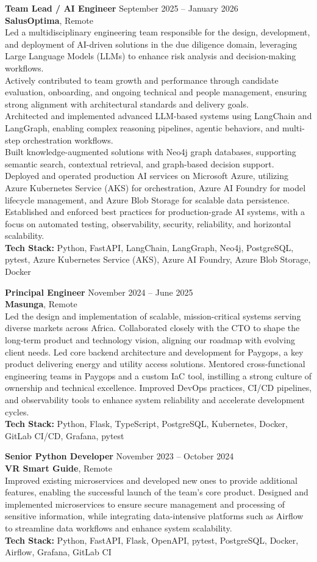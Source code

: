 \documentclass[margin, 10pt]{res} %
\newcommand{\jobheader}[4]{%
    \textbf{#1} \hfill #4\\
    \textbf{#2}, #3%
}
\newcommand{\jobentry}[6]{%
    \jobheader{#1}{#2}{#3}{#4}\\
    #5\\
    \textbf{Tech Stack:} #6
}
\begin{document}
\begin{resume}
    \jobentry{Team Lead / AI Engineer}{SalusOptima}{Remote}{September 2025 -- January 2026}{%
Led a multidisciplinary engineering team responsible for the design, development, and deployment of AI-driven solutions in the due diligence domain, leveraging Large Language Models (LLMs) to enhance risk analysis and decision-making workflows.\\
Actively contributed to team growth and performance through candidate evaluation, onboarding, and ongoing technical and people management, ensuring strong alignment with architectural standards and delivery goals.\\
Architected and implemented advanced LLM-based systems using LangChain and LangGraph, enabling complex reasoning pipelines, agentic behaviors, and multi-step orchestration workflows.\\
Built knowledge-augmented solutions with Neo4j graph databases, supporting semantic search, contextual retrieval, and graph-based decision support.\\
Deployed and operated production AI services on Microsoft Azure, utilizing Azure Kubernetes Service (AKS) for orchestration, Azure AI Foundry for model lifecycle management, and Azure Blob Storage for scalable data persistence.\\
Established and enforced best practices for production-grade AI systems, with a focus on automated testing, observability, security, reliability, and horizontal scalability.%
}{Python, FastAPI, LangChain, LangGraph, Neo4j, PostgreSQL, pytest, Azure Kubernetes Service (AKS), Azure AI Foundry, Azure Blob Storage, Docker}


    \jobentry{Principal Engineer}{Masunga}{Remote}{November 2024 -- June 2025}{%
Led the design and implementation of scalable, mission-critical systems serving diverse markets across Africa. Collaborated closely with the CTO to shape the long-term product and technology vision, aligning our roadmap with evolving client needs. Led core backend architecture and development for Paygops, a key product delivering energy and utility access solutions. Mentored cross-functional engineering teams in Paygops and a custom IaC tool, instilling a strong culture of ownership and technical excellence. Improved DevOps practices, CI/CD pipelines, and observability tools to enhance system reliability and accelerate development cycles.%
}{Python, Flask, TypeScript, PostgreSQL, Kubernetes, Docker, GitLab CI/CD, Grafana, pytest}


    \jobentry{Senior Python Developer}{VR Smart Guide}{Remote}{November 2023 -- October 2024}{%
Improved existing microservices and developed new ones to provide additional features, enabling the successful launch of the team's core product. Designed and implemented microservices to ensure secure management and processing of sensitive information, while integrating data-intensive platforms such as Airflow to streamline data workflows and enhance system scalability.%
}{Python, FastAPI, Flask, OpenAPI, pytest, PostgreSQL, Docker, Airflow, Grafana, GitLab CI}


\end{resume}
\end{document}
